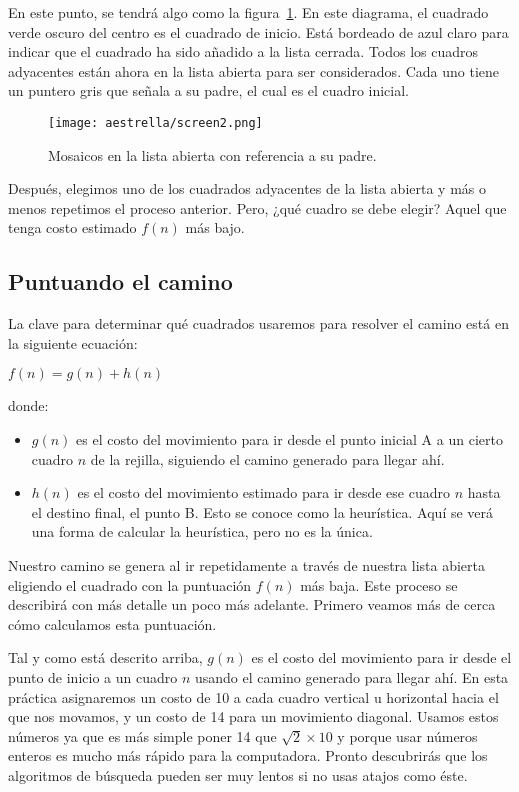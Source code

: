 En este punto, se tendrá algo como la figura~\ref{fig:fig2P4}. En este diagrama, el cuadrado verde oscuro del centro es el cuadrado de inicio. Está bordeado de azul claro para indicar que el cuadrado ha sido añadido a la lista cerrada. Todos los cuadros adyacentes están ahora en la lista abierta para ser considerados. Cada uno tiene un puntero gris que señala a su padre, el cual es el cuadro inicial.

\begin{figure}[h]
  \centering
  \texttt{[image: aestrella/screen2.png]}
  \caption{Mosaicos en la lista abierta con referencia a su padre.}
  \label{fig:fig2P4}
\end{figure}


Después, elegimos uno de los cuadrados adyacentes de la lista abierta y más o menos repetimos el proceso anterior. Pero, ¿qué cuadro se debe elegir? Aquel que tenga costo estimado \(f(n)\) más bajo.

\subsection{Puntuando el camino}

La clave para determinar qué cuadrados usaremos para resolver el camino está en la siguiente ecuación:\medskip

\begin{center}
\(f(n) = g(n) + h(n)\)
\end{center}\medskip

donde:

\begin{itemize}
  \item \(g(n)\) es el costo del movimiento para ir desde el punto inicial A a un cierto cuadro \(n\) de la rejilla, siguiendo el camino generado para llegar ahí.
  \item \(h(n)\) es el costo del movimiento estimado para ir desde ese cuadro \(n\) hasta el destino final, el punto B. Esto se conoce como la heurística. Aquí se verá una forma de calcular la heurística, pero no es la única.
\end{itemize}

Nuestro camino se genera al ir repetidamente a través de nuestra lista abierta eligiendo el cuadrado con la puntuación \(f(n)\) más baja. Este proceso se describirá con más detalle un poco más adelante. Primero veamos más de cerca cómo calculamos esta puntuación.

Tal y como está descrito arriba, \(g(n)\) es el costo del movimiento para ir desde el punto de inicio a un cuadro \(n\) usando el camino generado para llegar ahí. En esta práctica asignaremos un costo de 10 a cada cuadro vertical u horizontal hacia el que nos movamos, y un costo de 14 para un movimiento diagonal. Usamos estos números ya que es más simple poner 14 que \(\sqrt{2}\times10\) y porque usar números enteros es mucho más rápido para la computadora. Pronto descubrirás que los algoritmos de búsqueda pueden ser muy lentos si no usas atajos como éste.

